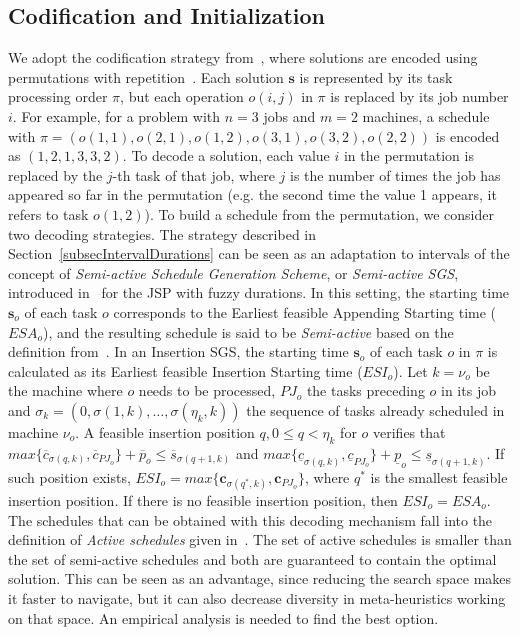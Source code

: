\documentclass[sn-mathphys]{sn-jnl}%
\theoremstyle{thmstyleone}%
\theoremstyle{thmstyletwo}%
\theoremstyle{thmstylethree}%
\begin{document}
\subsection{Codification and Initialization}\label{subsec:Codification}
We adopt the codification strategy from~\cite{Diaz2020genetic}, where solutions are encoded using permutations with repetition~\cite{Bierwirth1995}. Each solution $\boldsymbol{s}$ is represented by its task processing order $\pi$, but each operation $o(i,j)$ in $\pi$ is replaced by its job number $i$. For example, for a problem with $n=3$ jobs and $m=2$ machines, a schedule with $\pi=(o(1,1), o(2,1), o(1,2), o(3,1), o(3,2), o(2,2))$ is encoded as $(1,2,1,3,3,2)$. To decode a solution, each value $i$ in the permutation is replaced by the $j$-th task of that job, where $j$ is the number of times the job has appeared so far in the permutation (e.g. the second time the value 1 appears, it refers to task $o(1,2)$). To build a schedule from the permutation, we consider two decoding strategies.
The strategy described in Section~\ref{subsecIntervalDurations} can be seen as an adaptation to intervals of the concept of \textit{Semi-active Schedule Generation Scheme}, or \emph{Semi-active SGS}, introduced in~\cite{Palacios2014c} for the JSP with fuzzy durations. In this setting, the starting time $\mathbf{s}_o$ of each task $o$ corresponds to the Earliest feasible Appending Starting time ($ESA_o$), and the resulting schedule is said to be \emph{Semi-active} based on the definition from~\cite{Sprecher1995}. In an Insertion SGS, the starting time $\mathbf{s}_o$ of each task $o$ in $\pi$ is calculated as its Earliest feasible Insertion Starting time ($ESI_o$). Let $k=\nu_o$ be the machine where $o$ needs to be processed, $PJ_o$ the tasks preceding $o$ in its job and $\sigma_k = (0, \sigma(1, k), \dots, \sigma(\eta_k, k))$ the sequence of tasks already scheduled in machine $\nu_o$. A feasible insertion position $q, 0\leq q < \eta_k $ for $o$ verifies that $max\{\overline{c}_{\sigma(q,k)}, \overline{c}_{PJ_o}\}+\overline{p}_{o} \leq \overline{s}_{\sigma(q+1,k)}$ and $max\{\underline{c}_{\sigma(q,k)}, \underline{c}_{PJ_o}\}+\underline{p}_{o} \leq \underline{s}_{\sigma(q+1,k)}$. If such position exists, $ESI_o=max\{\mathbf{c}_{\sigma(q^*,k)}, \mathbf{c}_{PJ_o}\}$, where $q^*$ is the smallest feasible insertion position. If there is no feasible insertion position, then $ESI_o=ESA_o$. The schedules that can be obtained with this decoding mechanism fall into the definition of \textit{Active schedules} given in~\cite{Sprecher1995,Palacios2014c}. The set of active schedules is smaller than the set of semi-active schedules and both are guaranteed to contain the optimal solution. This can be seen as an advantage, since reducing the search space makes it faster to navigate, but it can also decrease diversity in meta-heuristics working on that space. An empirical analysis is needed to find the best option.
\end{document}
